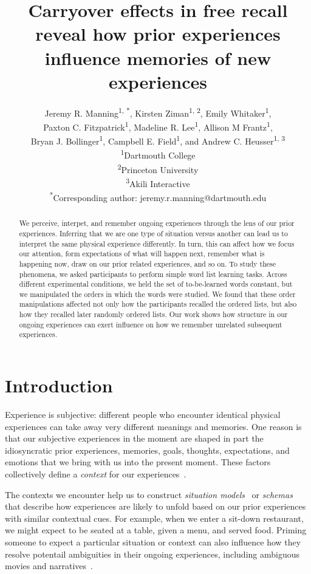 \documentclass[11pt]{article}
\title{Carryover effects in free recall reveal how prior experiences influence
memories of new experiences}
\author{Jeremy R. Manning\textsuperscript{1, *}, Kirsten
Ziman\textsuperscript{1, 2}, Emily Whitaker\textsuperscript{1},\\Paxton C.
Fitzpatrick\textsuperscript{1}, Madeline R. Lee\textsuperscript{1}, Allison M
Frantz\textsuperscript{1},\\Bryan J. Bollinger\textsuperscript{1}, Campbell E.
Field\textsuperscript{1}, and Andrew C. Heusser\textsuperscript{1,
3}\\\textsuperscript{1}Dartmouth College\\\textsuperscript{2}Princeton
University\\\textsuperscript{3}Akili
Interactive\\\textsuperscript{*}Corresponding author:
jeremy.r.manning@dartmouth.edu}
\date{}
\begin{document}
\maketitle

\begin{abstract} We perceive, interpet, and remember ongoing experiences
through the lens of our prior experiences. Inferring that we are one type of
situation versus another can lead us to interpret the same physical experience
differently. In turn, this can affect how we focus our attention, form
expectations of what will happen next, remember what is happening now, draw on
our prior related experiences, and so on. To study these phenomena, we asked
participants to perform simple word list learning tasks. Across different
experimental conditions, we held the set of to-be-learned words constant, but
we manipulated the orders in which the words were studied. We found that these
order manipulations affected not only how the participants recalled the ordered
lists, but also how they recalled later randomly ordered lists. Our work shows
how structure in our ongoing experiences can exert influence on how we remember
unrelated subsequent experiences. \end{abstract}


\section*{Introduction}


Experience is subjective: different people who encounter identical physical
experiences can take away very different meanings and memories. One reason is
that our subjective experiences in the moment are shaped in part the
idiosyncratic prior experiences, memories, goals, thoughts, expectations, and
emotions that we bring with us into the present moment. These factors
collectively define a \textit{context} for our experiences~\citep{Mann20}. 


The contexts we encounter help us to construct \textit{situation
models}~\citep{RangRitc12, MannEtal15} or \textit{schemas}~\citep{MasiEtal22,
BaldEtal18} that describe how experiences are likely to unfold based on our
prior experiences with similar contextual cues. For example, when we enter a
sit-down restaurant, we might expect to be seated at a table, given a menu, and
served food. Priming someone to expect a particular situation or context can
also influence how they resolve potentail ambiguities in their ongoing
experiences, including ambiguous movies and narratives~\citep{YeshEtal17}.
\end{document}
